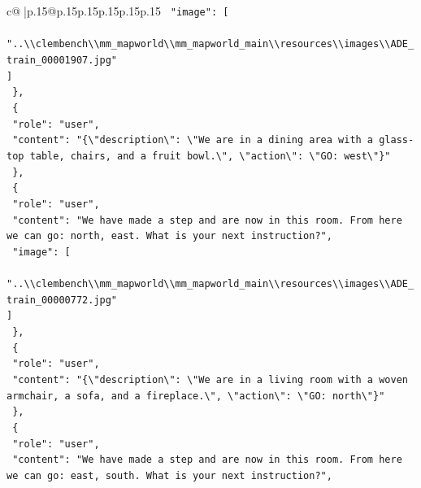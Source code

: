 \documentclass{article}
\begin{document}
{\begin{supertabular}{c@{$\;$}|p{.15\linewidth}@{}p{.15\linewidth}p{.15\linewidth}p{.15\linewidth}p{.15\linewidth}p{.15\linewidth}}
{{{\texttt{    "image": {[}} \\
\texttt{      "..\textbackslash{}\textbackslash{}clembench\textbackslash{}\textbackslash{}mm\_mapworld\textbackslash{}\textbackslash{}mm\_mapworld\_main\textbackslash{}\textbackslash{}resources\textbackslash{}\textbackslash{}images\textbackslash{}\textbackslash{}ADE\_train\_00001907.jpg"} \\
\texttt{    {]}} \\
\texttt{  \},} \\
\texttt{  \{} \\
\texttt{    "role": "user",} \\
\texttt{    "content": "\{\textbackslash{}"description\textbackslash{}": \textbackslash{}"We are in a dining area with a glass{-}top table, chairs, and a fruit bowl.\textbackslash{}", \textbackslash{}"action\textbackslash{}": \textbackslash{}"GO: west\textbackslash{}"\}"} \\
\texttt{  \},} \\
\texttt{  \{} \\
\texttt{    "role": "user",} \\
\texttt{    "content": "We have made a step and are now in this room. From here we can go: north, east. What is your next instruction?",} \\
\texttt{    "image": {[}} \\
\texttt{      "..\textbackslash{}\textbackslash{}clembench\textbackslash{}\textbackslash{}mm\_mapworld\textbackslash{}\textbackslash{}mm\_mapworld\_main\textbackslash{}\textbackslash{}resources\textbackslash{}\textbackslash{}images\textbackslash{}\textbackslash{}ADE\_train\_00000772.jpg"} \\
\texttt{    {]}} \\
\texttt{  \},} \\
\texttt{  \{} \\
\texttt{    "role": "user",} \\
\texttt{    "content": "\{\textbackslash{}"description\textbackslash{}": \textbackslash{}"We are in a living room with a woven armchair, a sofa, and a fireplace.\textbackslash{}", \textbackslash{}"action\textbackslash{}": \textbackslash{}"GO: north\textbackslash{}"\}"} \\
\texttt{  \},} \\
\texttt{  \{} \\
\texttt{    "role": "user",} \\
\texttt{    "content": "We have made a step and are now in this room. From here we can go: east, south. What is your next instruction?",} \\
}}}
\end{supertabular}}
\end{document}
